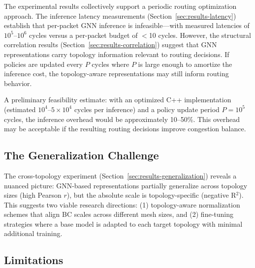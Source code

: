 \documentclass[conference]{IEEEtran}
\begin{document}
The experimental results collectively support a periodic routing optimization approach. The inference latency measurements (Section~\ref{sec:results-latency}) establish that per-packet GNN inference is infeasible---with measured latencies of $10^5$--$10^6$ cycles versus a per-packet budget of $<$10 cycles. However, the structural correlation results (Section~\ref{sec:results-correlation}) suggest that GNN representations carry topology information relevant to routing decisions. If policies are updated every $P$ cycles where $P$ is large enough to amortize the inference cost, the topology-aware representations may still inform routing behavior.

A preliminary feasibility estimate: with an optimized C++ implementation (estimated $10^4$--$5 \times 10^4$ cycles per inference) and a policy update period $P = 10^5$ cycles, the inference overhead would be approximately 10--50\%. This overhead may be acceptable if the resulting routing decisions improve congestion balance.

\subsection{The Generalization Challenge}

The cross-topology experiment (Section~\ref{sec:results-generalization}) reveals a nuanced picture: GNN-based representations partially generalize across topology sizes (high Pearson $r$), but the absolute scale is topology-specific (negative R$^2$). This suggests two viable research directions: (1) topology-aware normalization schemes that align BC scales across different mesh sizes, and (2) fine-tuning strategies where a base model is adapted to each target topology with minimal additional training.

\subsection{Limitations}
\label{sec:limitations}
\end{document}
